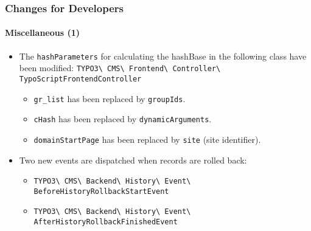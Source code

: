 
\begin{frame}[fragile]
	\frametitle{Changes for Developers}
	\framesubtitle{Miscellaneous (1)}

	\begin{itemize}
		\item The \texttt{hashParameters} for calculating the hashBase in the following class have been modified:\newline
			\small
				\texttt{TYPO3\textbackslash
					CMS\textbackslash
					Frontend\textbackslash
					Controller\textbackslash
					TypoScriptFrontendController}
			\normalsize

			\begin{itemize}
				\item \texttt{gr\_list} has been replaced by \texttt{groupIds}.
				\item \texttt{cHash} has been replaced by \texttt{dynamicArguments}.
				\item \texttt{domainStartPage} has been replaced by \texttt{site} (site identifier).
			\end{itemize}

		\item Two new events are dispatched when records are rolled back:

			\begin{itemize}\smaller
				\item \texttt{TYPO3\textbackslash
					CMS\textbackslash
					Backend\textbackslash
					History\textbackslash
					Event\textbackslash
					BeforeHistoryRollbackStartEvent}
				\item \texttt{TYPO3\textbackslash
					CMS\textbackslash
					Backend\textbackslash
					History\textbackslash
					Event\textbackslash
					AfterHistoryRollbackFinishedEvent}
			\end{itemize}\normalsize

	\end{itemize}

\end{frame}


